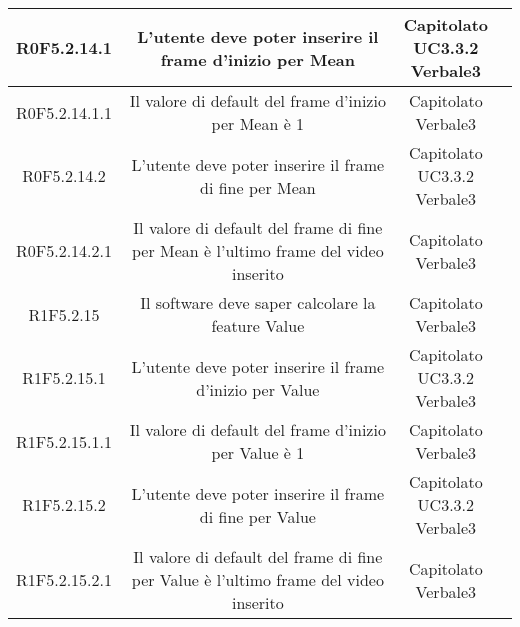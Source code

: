 \begin{center}
\begin{longtable}{|c|c|c|c|}
\hline
R0F5.2.14.1   & \parbox[t]{\larghezza}{L'utente deve poter inserire il frame d'inizio per Mean}  & \parbox[t]{\dimFonti}{ Capitolato \\ UC3.3.2 \\ Verbale3 \\} \\
\hline
R0F5.2.14.1.1   & \parbox[t]{\larghezza}{Il valore di default del frame d'inizio per Mean è 1}  & \parbox[t]{\dimFonti}{ Capitolato \\ Verbale3 \\} \\
\hline
R0F5.2.14.2   & \parbox[t]{\larghezza}{L'utente deve poter inserire il frame di fine per Mean}  & \parbox[t]{\dimFonti}{ Capitolato \\ UC3.3.2 \\ Verbale3 \\} \\
\hline
R0F5.2.14.2.1   & \parbox[t]{\larghezza}{Il valore di default del frame di fine per Mean è l'ultimo frame del video inserito}  & \parbox[t]{\dimFonti}{ Capitolato \\ Verbale3 \\} \\
\hline
R1F5.2.15   & \parbox[t]{\larghezza}{Il software deve saper calcolare la feature\glossario{} Value}  & \parbox[t]{\dimFonti}{ Capitolato \\ Verbale3 \\} \\
\hline
R1F5.2.15.1   & \parbox[t]{\larghezza}{L'utente deve poter inserire il frame d'inizio per Value}  & \parbox[t]{\dimFonti}{ Capitolato \\ UC3.3.2 \\ Verbale3 \\} \\
\hline
R1F5.2.15.1.1   & \parbox[t]{\larghezza}{Il valore di default del frame d'inizio per Value è 1}  & \parbox[t]{\dimFonti}{ Capitolato \\ Verbale3 \\} \\
\hline
R1F5.2.15.2   & \parbox[t]{\larghezza}{L'utente deve poter inserire il frame di fine per Value}  & \parbox[t]{\dimFonti}{ Capitolato \\ UC3.3.2 \\ Verbale3 \\} \\
\hline
R1F5.2.15.2.1   & \parbox[t]{\larghezza}{Il valore di default del frame di fine per Value è l'ultimo frame del video inserito}  & \parbox[t]{\dimFonti}{ Capitolato \\ Verbale3 \\} \\

\end{longtable}
\end{center}
